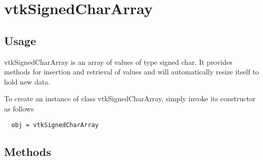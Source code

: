 \section{vtkSignedCharArray}

\subsection{Usage}

 vtkSignedCharArray is an array of values of type signed char.
 It provides methods for insertion and retrieval of values and will
 automatically resize itself to hold new data.

To create an instance of class vtkSignedCharArray, simply
invoke its constructor as follows
\begin{verbatim}
  obj = vtkSignedCharArray
\end{verbatim}
\subsection{Methods}

